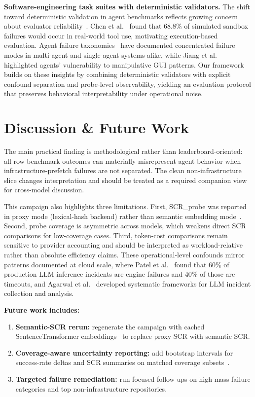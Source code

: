 \documentclass[11pt]{article}
\begin{document}
\textbf{Software-engineering task suites with deterministic validators.}
The shift toward deterministic validation in agent benchmarks reflects growing concern about evaluator reliability~\cite{wei2024utboost,Hu2025RevisitingSWE}. Chen et al.~\cite{Chen2023ToolEmu} found that 68.8\% of simulated sandbox failures would occur in real-world tool use, motivating execution-based evaluation. Agent failure taxonomies~\cite{tyen2024mast,zhang2024systemfailures,Guo2024Defects} have documented concentrated failure modes in multi-agent and single-agent systems alike, while Jiang et al.~\cite{Jiang2025DarkPatterns} highlighted agents' vulnerability to manipulative GUI patterns. Our framework builds on these insights by combining deterministic validators with explicit confound separation and probe-level observability, yielding an evaluation protocol that preserves behavioral interpretability under operational noise.

\section{Discussion \& Future Work}
The main practical finding is methodological rather than leaderboard-oriented: all-row benchmark outcomes can materially misrepresent agent behavior when infrastructure-prefetch failures are not separated. The clean non-infrastructure slice changes interpretation and should be treated as a required companion view for cross-model discussion.

This campaign also highlights three limitations. First, SCR\_probe was reported in proxy mode (lexical-hash backend) rather than semantic embedding mode~\cite{reimers2019sentencebert}. Second, probe coverage is asymmetric across models, which weakens direct SCR comparisons for low-coverage cases. Third, token-cost comparisons remain sensitive to provider accounting and should be interpreted as workload-relative rather than absolute efficiency claims. These operational-level confounds mirror patterns documented at cloud scale, where Patel et al.~\cite{Patel2025InferenceReliability} found that 60\% of production LLM inference incidents are engine failures and 40\% of those are timeouts, and Agarwal et al.~\cite{Agarwal2025FAILS} developed systematic frameworks for LLM incident collection and analysis.

\textbf{Future work includes:}
\begin{enumerate}
  \item \textbf{Semantic-SCR rerun:} regenerate the campaign with cached SentenceTransformer embeddings~\cite{reimers2019sentencebert} to replace proxy SCR with semantic SCR.
  \item \textbf{Coverage-aware uncertainty reporting:} add bootstrap intervals for success-rate deltas and SCR summaries on matched coverage subsets~\cite{Barber2022ConformalPrediction}.
  \item \textbf{Targeted failure remediation:} run focused follow-ups on high-mass failure categories and top non-infrastructure repositories.
\end{enumerate}
\end{document}
